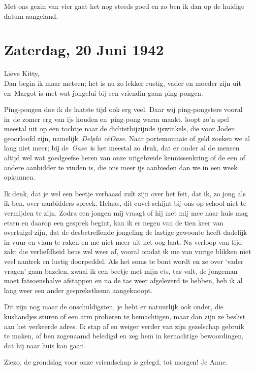 \documentclass{book}
\begin{document}
Met ons gezin van vier gaat het nog steeds goed en zo ben ik dan op de
huidige datum aangeland.

\chapter{Zaterdag, 20 Juni 1942}

Lieve Kitty,\\Dan begin ik maar meteen; het is nu zo lekker rustig,
vader en moeder zijn uit en~Margot is met wat jongelui bij een vriendin
gaan ping-pongen.

Ping-pongen doe ik de laatste tijd ook erg veel. Daar wij ping-pongsters
vooral in~de zomer erg van ijs houden en~ping-pong warm maakt, loopt
zo'n spel meestal uit op een tochtje naar de dichtstbijzijnde
ijswinkels, die voor Joden geoorloofd zijn,
namelijk~\emph{Delphi}~of\emph{Oase}. Naar portemonnaie of geld zoeken
we al lang niet meer; bij de~\emph{Oase}~is het meestal zo druk, dat er
onder al de mensen altijd wel wat goedgeefse heren van onze uitgebreide
kennissenkring of de een of andere aanbidder te vinden is, die ons meer
ijs aanbieden dan we in een week opkunnen.

Ik denk, dat je wel een beetje verbaasd zult zijn over het feit, dat ik,
zo jong als ik ben, over aanbidders spreek. Helaas, dit euvel schijnt
bij ons op school niet te vermijden te zijn. Zodra een jongen mij vraagt
of hij met mij mee naar huis mag etsen en daarop een gesprek begint, kan
ik er negen van de tien keer van overtuigd zijn, dat de desbetreffende
jongeling de lastige gewoonte heeft dadelijk in vuur en vlam te raken en
me niet meer uit het oog laat. Na verloop van tijd zakt die verliefdheid
heus wel weer af, vooral omdat ik me van vurige blikken niet veel
aantrek en lustig doorpeddel. Als het soms te bont wordt en ze over
`vader vragen' gaan bazelen, zwaai ik een beetje met mijn ets, tas valt,
de jongeman moet fatsoenshalve afstappen en na de tas weer afgeleverd te
hebben, heb ik al lang weer een ander gespreksthema aangeknoopt.

Dit zijn nog maar de onschuldigsten, je hebt er natuurlijk ook onder,
die kushandjes sturen of een arm proberen te bemachtigen, maar dan zijn
ze beslist aan het verkeerde adres. Ik stap af en weiger verder van zijn
gezelschap gebruik te maken, of ben zogenaamd beledigd en zeg hem in
kernachtige bewoordingen, dat hij naar huis kan gaan.

Ziezo, de grondslag voor onze vriendschap is gelegd, tot morgen! Je
Anne.
\end{document}
